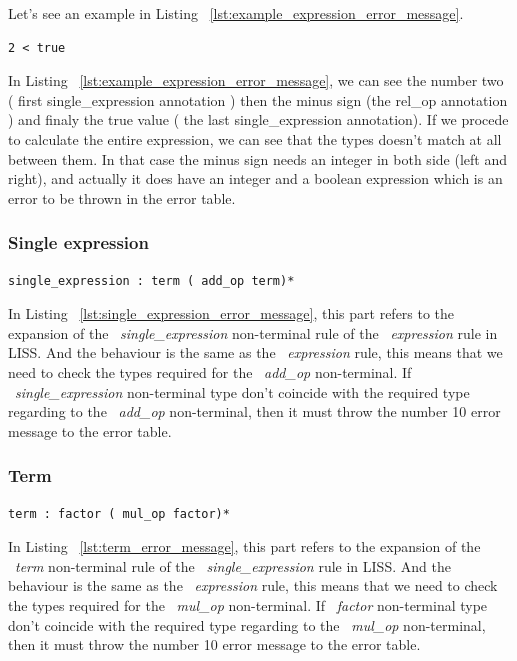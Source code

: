 \documentclass[
  oneside,
  11pt, a4paper,
  footinclude=true,
  headinclude=true,
  cleardoublepage=empty
]{scrbook}
\begin{document}
Let's see an example in Listing ~\ref{lst:example_expression_error_message}.

\begin{lstlisting}[caption={Example of an error message in expression rule},label={lst:example_expression_error_message}]
  2 < true
\end{lstlisting}

In Listing ~\ref{lst:example_expression_error_message}, we can see the number two ( first single\_expression annotation ) then the minus sign (the rel\_op annotation ) and finaly the true value ( the last single\_expression annotation).
If we procede to calculate the entire expression, we can see that the types doesn't match at all between them.
In that case the minus sign needs an integer in both side (left and right), and actually it does have an integer and a boolean expression which is an error to be thrown in the error table.

\subsubsection{Single expression}

\begin{lstlisting}[caption={Single\_expresion rule in LISS},label={lst:single_expression_error_message}]
  single_expression : term ( add_op term)*
\end{lstlisting}

In Listing ~\ref{lst:single_expression_error_message}, this part refers to the expansion of the ~\textit{single\_expression} non-terminal rule of the ~\textit{expression} rule in LISS.
And the behaviour is the same as the ~\textit{expression} rule, this means that we need to check the types required for the ~\textit{add\_op} non-terminal. If ~\textit{single\_expression} non-terminal type don't coincide with the required type regarding to the ~\textit{add\_op} non-terminal, then it must throw the number 10 error message to the error table.

\subsubsection{Term}

\begin{lstlisting}[caption={Term rule in LISS},label={lst:term_error_message}]
  term : factor ( mul_op factor)*
\end{lstlisting}

In Listing ~\ref{lst:term_error_message}, this part refers to the expansion of the ~\textit{term} non-terminal rule of the ~\textit{single\_expression} rule in LISS.
And the behaviour is the same as the ~\textit{expression} rule, this means that we need to check the types required for the ~\textit{mul\_op} non-terminal. If ~\textit{factor} non-terminal type don't coincide with the required type regarding to the ~\textit{mul\_op} non-terminal, then it must throw the number 10 error message to the error table.
\end{document}

